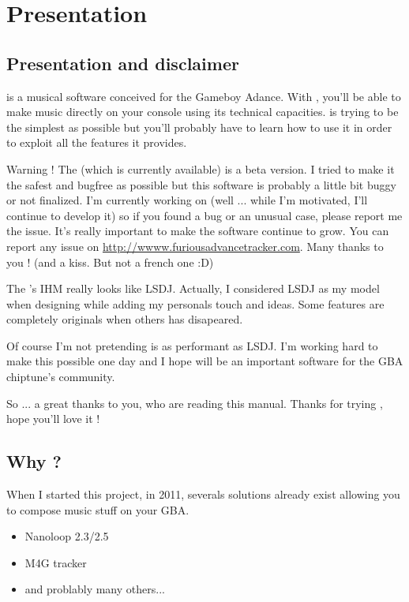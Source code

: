 \documentclass[12pt,a4paper]{article}
\begin{document}
  \tableofcontents{}
  \newpage

  \section{Presentation}
    \subsection{Presentation and disclaimer}
    \FAT is a musical software conceived for the Gameboy Adance.
    With \FAT, you'll be able to make music directly on your console using its technical capacities.
    \FAT is trying to be the simplest as possible but you'll probably have to learn how to use it in order to exploit all the features it provides.
    \medskip

    Warning ! The \fatversion (which is currently available) is a beta version.
    I tried to make it the safest and bugfree as possible but this software is probably a little bit buggy or not finalized.
    I'm currently working on \FAT (well ... while I'm motivated, I'll continue to develop it) so if you found a bug or an unusual case, please report me the issue.
    It's really important to make the software continue to grow. You can report any issue on \url{http://wwww.furiousadvancetracker.com}.
    Many thanks to you ! (and a kiss. But not a french one :D)
    \medskip

    The \FAT's IHM really looks like LSDJ. Actually, I considered LSDJ as my model when designing \FAT while adding my personals touch and ideas.
    Some features are completely originals when others has disapeared.
    \medskip

    Of course I'm not pretending \FAT is as performant as LSDJ. I'm working hard to make this possible one day and I hope \FAT will be an important software for the GBA chiptune's community.
    \medskip

    So ... a great thanks to you, who are reading this manual. Thanks for trying \FAT, hope you'll love it !

    \subsection{Why \FAT ?}
    When I started this project, in 2011, severals solutions already exist allowing you to compose music stuff on your GBA.
    \medskip

    \begin{itemize}
        \item{Nanoloop 2.3/2.5}
        \item{M4G tracker}
        \item{and problably many others...}
    \end{itemize}\medskip
\end{document}
